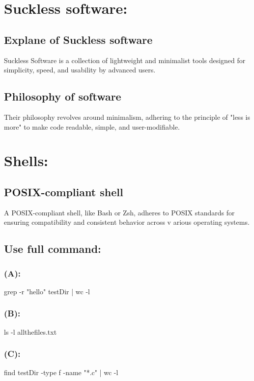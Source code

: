 \documentclass{article}
\begin{document}
\section*{Suckless software:}

\subsection*{Explane of Suckless software}

Suckless Software is a collection of 
lightweight and minimalist tools designed 
for simplicity, speed, and usability by advanced users.
\subsection*{Philosophy of software}

Their philosophy revolves around minimalism, 
adhering to the principle of "less is more" 
to make code readable, simple, and user-modifiable.

\section*{Shells:}

\subsection*{POSIX-compliant shell}

A POSIX-compliant shell, like Bash or Zsh, 
adheres to POSIX standards for ensuring 
compatibility and consistent behavior across v
arious operating systems.


\subsection*{Use full command:}


\subsubsection*{(A):}

grep -r "hello" testDir | wc -l


\subsubsection*{(B):}

ls -l  allthefiles.txt

\subsubsection*{(C):}

find testDir -type f -name "*.c" | wc -l
\end{document}
